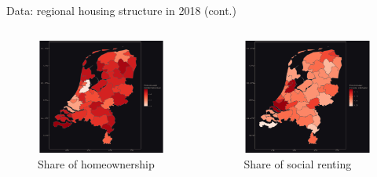 \documentclass{beamer}
\begin{document}
\begin{frame}{Data: regional housing structure in 2018 (cont.)}
		\begin{columns}
	\begin{column}{0.5\textwidth}
	  \begin{center}
		\begin{figure}
		  \includegraphics[width=1.1\textwidth]{../../fig/p_homeown}
		  \caption{Share of homeownership}
		  \end{figure}
		\end{center}
	\end{column}
	\begin{column}{0.5\textwidth}
		\begin{center}
		  \begin{figure}
		  \includegraphics[width=1.1\textwidth]{../../fig/p_socrent}
		  \caption{Share of social renting}
		  \end{figure}
		\end{center}
	\end{column}
\end{columns}
\end{frame}
\end{document}
